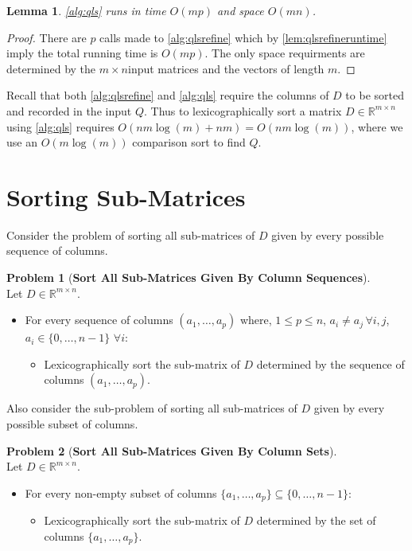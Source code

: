 \documentclass[a4paper,10pt,reqno]{amsart}
\newcommand\R{\mathbb R}
\newtheorem{lemma}{Lemma}
\theoremstyle{definition}
\newtheorem{problem}{Problem}
\begin{document}
\begin{lemma} 
\autoref{alg:qls} runs in time $O(mp)$ and space $O(mn)$.
\end{lemma}
\begin{proof}
There are $p$ calls made to \autoref{alg:qlsrefine} which by
\autoref{lem:qlsrefineruntime} imply the total running time is $O(mp)$.
The only space requirments are determined by the $m \times n $input matrices
and the vectors of length $m$.
\end{proof}

Recall that both \autoref{alg:qlsrefine} and \autoref{alg:qls} require the
columns of $D$ to be sorted and recorded in the input $Q$. Thus to
lexicographically sort a matrix $D \in \R^{m \times n}$ using
\autoref{alg:qls} requires $O(nm\log(m) + nm) = O(nm\log(m))$, where we use an
$O(m\log(m))$ comparison sort to find $Q$.


\section{Sorting Sub-Matrices}
\label{sec:sortingsubmat}

Consider the problem of sorting all sub-matrices of $D$ given by every possible
sequence of columns. 

\begin{problem}[\bf Sort All Sub-Matrices Given By Column Sequences] $\phantom{a}$ \\
Let $D \in \R^{m \times n}$. 
\begin{itemize}
    \item For every sequence of columns $(a_1,\ldots,a_p)$ where, $1 \leq p \leq n$, $a_i \neq a_j \, \forall i,j$, $a_i \in \{0,\ldots,n-1\}$ $\forall i$:
    \begin{itemize}
        \item Lexicographically sort the sub-matrix of $D$ determined by the sequence of columns $(a_1,\ldots,a_p)$.
    \end{itemize}
    \label{prob:allseq}
\end{itemize}
\end{problem}

Also consider the sub-problem of sorting all sub-matrices of 
$D$ given by every possible subset of columns.

\begin{problem}[\bf Sort All Sub-Matrices Given By Column Sets] $\phantom{a}$ \\
Let $D \in \R^{m \times n}$. 
\begin{itemize}
    \item For every non-empty subset of columns $\{a_1,\ldots,a_p\} \subseteq \{0,\ldots,n-1\}$:
    \begin{itemize}
        \item Lexicographically sort the sub-matrix of $D$ determined by the set of columns $\{a_1,\ldots,a_p\}$.
    \end{itemize}
    \label{prob:allsubset}
\end{itemize}
\end{problem}
\end{document}
